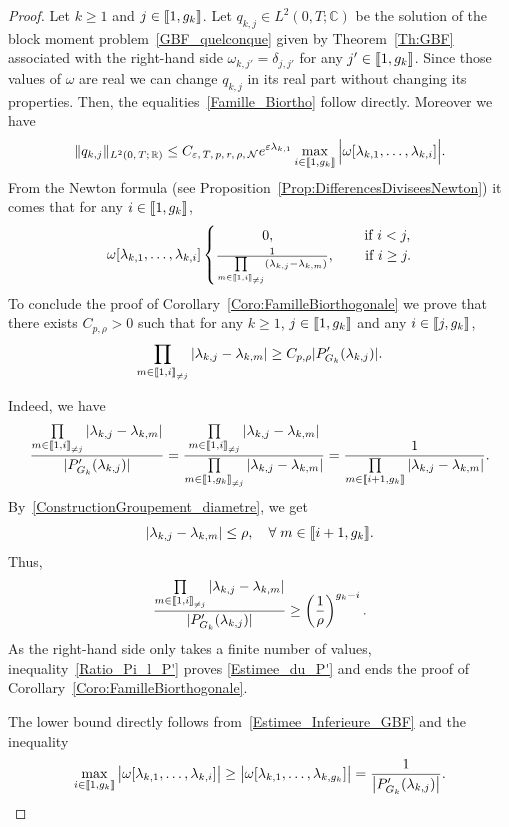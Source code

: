 \documentclass[10pt]{amsart}
\theoremstyle{definition}\newtheorem{defi}[theo]{Definition}\newtheorem{rema}[theo]{Remark}\newtheorem{exam}[theo]{Example}\newtheorem{exem}[theo]{Example}\newtheorem{nota}[theo]{Notation}
\newcommand{\llbracket}{\mathopen{[\mkern -2.7mu[}}
\newcommand{\rrbracket}{\mathclose{]\mkern -2.7mu]}}
\newcommand{\inter}[2]{\llbracket #1,#2 \rrbracket}
\newcommand{\interexclu}[3]{\llbracket #1,#2\rrbracket_{\neq #3}}
\newcommand{\n}{g}
\newcommand{\NN}{\mathcal{N}}
\newcommand{\R}{\mathbb{R}}
\newcommand{\C}{\mathbb{C}}
\let\oldforall\forall
\renewcommand*{\forall}{\mathrel{\oldforall}}
\begin{document}
\begin{proof}
Let $k \geq 1$ and $j \in \inter{1}{\n_k}$. Let $q_{k,j} \in L^2(0,T ; \C)$ be the solution of the block moment problem~\eqref{GBF_quelconque} given by Theorem~\ref{Th:GBF} associated with the right-hand side $\omega_{k, j'} = \delta_{j,j'}$ for any $j' \in \inter{1}{\n_k}$. Since those values of $\omega$ are real we can change $q_{k,j}$ in its real part without changing its properties. Then, the equalities~\eqref{Famille_Biortho} follow directly. Moreover we have
\[
\| q_{k,j} \|_{L^2(0,\,T ;\,\R)} \leq C_{\varepsilon,\,T,\,p,\,r,\,\rho,\,\NN} e^{\varepsilon \lambda_{k,1}} \max \limits_{i\in \inter{1}{\n_k}} \Big| \omega[\lambda_{k,1}, \dots, \lambda_{k,i}] \Big|.
\]
From the Newton formula (see Proposition~\ref{Prop:DifferencesDiviseesNewton}) it comes that for any $i \in \inter{1}{\n_k}$,
\begin{equation*}
\omega[\lambda_{k,1}, \dots, \lambda_{k,i}] \begin{cases}
\mkern60mu 0,& \quad\;\text{if }i<j,\\
\frac{1}{\prod\limits_{m \in \interexclu{1}{i}{j}} (\lambda_{k,j}-\lambda_{k,m})},&\quad \text{ if }i\geq j.
\end{cases}
\end{equation*}
To conclude the proof of Corollary~\ref{Coro:FamilleBiorthogonale} we prove that there exists $C_{p, \rho}>0$ such that for any $k\geq 1$, $j \in \inter{1}{\n_k}$ and any $i \in \inter{j}{\n_k}$,
\begin{equation}\label{Estimee_du_P'}
\prod_{m \in \interexclu{1}{i}{j}} | \lambda_{k,j} - \lambda_{k,m}| \geq C_{p,\rho} |P_{G_k}' (\lambda_{k,j}) |.
\end{equation}

Indeed, we have
\begin{equation*}
\frac{ \prod\limits_{m\in \interexclu{1}{i}{j} } | \lambda_{k,j} - \lambda_{k,m}|}{|P_{G_k}' (\lambda_{k,j}) |} = \frac{\prod\limits_{m\in \interexclu{1}{i}{j}} | \lambda_{k,j} - \lambda_{k,m}|}{\prod\limits_{m\in \interexclu{1}{\n_k}{j}} | \lambda_{k,j} - \lambda_{k,m}|} = \frac{1}{\prod\limits_{m\in \inter{i+1}{\n_k}} | \lambda_{k,j} - \lambda_{k,m}|}.
\end{equation*}
By~\eqref{ConstructionGroupement_diametre}, we get
\[
|\lambda_{k,j}-\lambda_{k,m}| \leq \rho, \quad \forall m \in \inter{i+1}{\n_k}.
\]
Thus,
\begin{equation}\label{Ratio_Pi_l_P'}
\frac{\prod\limits_{m\in \interexclu{1}{i}{j} } | \lambda_{k,j} - \lambda_{k,m}|}{|P_{G_k}' (\lambda_{k,j}) |}
\geq \left(\frac{1}{\rho} \right)^{\n_k-i}.
\end{equation}
As the right-hand side only takes a finite number of values, inequality~\eqref{Ratio_Pi_l_P'} proves \eqref{Estimee_du_P'} and ends the proof of Corollary~\ref{Coro:FamilleBiorthogonale}.

The lower bound directly follows from~\eqref{Estimee_Inferieure_GBF} and the inequality
\[
\max \limits_{i\in \inter{1}{\n_k}} \big| \omega[\lambda_{k,1}, \dots, \lambda_{k,i}] \big| \geq \big| \omega[\lambda_{k,1}, \dots, \lambda_{k,\n_k}] \big| = \frac{1}{\left| P_{G_k}'(\lambda_{k,j}) \right| }.\qedhere
\]
\end{proof}
\end{document}
